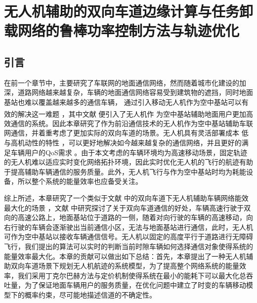 \chapter{无人机辅助的双向车道边缘计算与任务卸载网络的鲁棒功率控制方法与轨迹优化}

\label{chap:table第四章}
\section{引言}\label{section4-1}
\label{chap:introduction第四章}
在前一个章节中，主要研究了车联网的地面通信网络，然而随着城市化建设的加深，道路网络越来越复杂，车辆的地面通信网络容易受到建筑物的遮挡，同时地面基站也难以覆盖越来越多的通信车辆，
通过引入移动无人机作为空中基站可以有效的解决这一难题  \textsuperscript{\cite{Effect2020,Performance2022}}，其中文献 \cite{WirelessRelay5937283} 便引入了无人机作
为空中基站辅助地面用户更加高效通信的系统。因此本章研究了作为前沿通信技术的无人机作为空中基站辅助车联网通信，并着重考虑了更加实际的双向车道的场景。无人机具有灵活部署成本
低与高机动性的特性  \cite{无人机技术辅助的车联网,王智煊2023无人机辅助下的车联边缘计算卸载机制研究,Joint9453853}，可以更好地解决如今越来越复杂的通信网络，并且更好的满足车辆用户的QoS需求 \cite{无人机QoS9373692}。由于本文考虑的车辆环境均为高速移动场景，固定轨迹的无人机难以适应实时变化网络拓扑环境，因此实时优化无人机的飞行的航迹有助于提高辅助车辆通信的服务质量。此外，无人机飞行与作为空中基站时均为耗能设备，所以整个系统的能量效率也应备受关注。

综上所述，本章研究了一个类似于文献 \cite{twoway7091030}中的双向车道下无人机辅助车辆网络能效最大化的场景 ，文献 \cite{twoway5753961,twoway575396233,Spatial4490168,Stochastic6576809}中研究探讨了关于双向车道通信的好处，车辆高速行驶于双向的高速公路上，地面基站位于道路的一侧，随着对向行驶的车辆的高速移动，向右行驶的车辆会逐渐驶出当前通信小区，无法与地面基站进行通信，此时，无人机可作为空中基站以接收车辆通信信号。无人机以固定的高度平行于道路进行无障碍飞行，我们提出的算法可以实时的判断当前时隙车辆如何选择通信对象使得系统的能量效率最大化。本章的贡献可以做出如下总结：首先，本章提出了一种无人机辅助双向车道场景下规划无人机航迹的系统模型，为了提高整个网络系统的能量效率，我们采用丁克尔巴赫方法与定价机制使得系统在最小的能耗下可以最大化总吞吐量，为了保证地面车辆用户的服务质量，在优化问题中建立了时变的车辆移动模型下的概率约束，尽可能地描述信道的不确定性。
